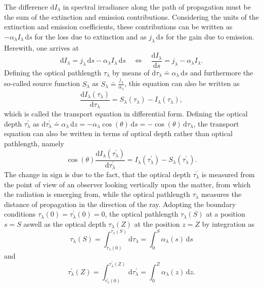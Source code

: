 \documentclass[a4paper,11pt]{report}
\def\fc#1{{\color{black}{#1}}} %
\begin{document}
The difference $\mathrm{d}I_\lambda$ in spectral irradiance along the path of propagation must be the sum of the extinction and emission contributions. Considering the units of the extinction and emission coefficients, these contributions can be written as $-\alpha_\lambda I_\lambda \,\mathrm{d}s$ for the loss due to extinction and as $j_\lambda \,\mathrm{d}s$ for the gain due to emission. Herewith, one arrives at \begin{equation}
\mathrm{d}I_\lambda = j_\lambda\,\mathrm{d}s - \alpha_\lambda I_\lambda\,\mathrm{d}s \quad \Leftrightarrow \quad \frac{\mathrm{d}I_\lambda}{\mathrm{d}s} = j_\lambda - \alpha_\lambda I_\lambda.
\end{equation} Defining the optical pathlength $\tau_\lambda$ by means of $\mathrm{d}\tau_\lambda \doteq \alpha_\lambda \,\mathrm{d}s$ and furthermore the so-called source function $S_\lambda$ as $S_\lambda \doteq \frac{j_\lambda}{\alpha_\lambda}$, this equation can also be written as \begin{equation}\label{eq:transportequationdiffform_opt_pathlength}
\frac{\mathrm{d}I_\lambda(\tau_\lambda)}{\mathrm{d}\tau_\lambda} = S_\lambda(\tau_\lambda) - I_\lambda(\tau_\lambda),
\end{equation} which is called the transport equation in differential form. Defining the optical depth $\tau^\prime_\lambda$ as $\mathrm{d}\tau^\prime_\lambda \doteq \alpha_\lambda\,\mathrm{d}z = -\alpha_\lambda \cos(\theta)\,\mathrm{d}s = -\cos(\theta)\,\mathrm{d}\tau_\lambda$, the transport equation can also be written in terms of optical depth rather than optical pathlength, namely \begin{equation}\label{eq:transportequationdiffform_opt_depth}
\cos(\theta)\frac{\mathrm{d}I_\lambda(\tau^\prime_\lambda)}{\mathrm{d}\tau^\prime_\lambda} = I_\lambda(\tau^\prime_\lambda) - S_\lambda(\tau^\prime_\lambda).
\end{equation} The change in sign is due to the fact, that the optical depth $\tau^\prime_\lambda$ is measured from the point of view of an observer looking vertically upon the matter, from which the radiation is emerging from, while the optical pathlength $\tau_\lambda$ measures the distance of propagation in the direction of the ray. Adopting the boundary conditions $\tau_\lambda(0) = \tau_\lambda^\prime(0) = 0$, the optical pathlength $\tau_\lambda(S)$ at a position $s=S$ aswell as the optical depth $\tau_\lambda(Z)$ at the position $z=Z$ \fc{are given} by integration as \begin{equation}
\tau_\lambda(S) = \int_{\tau_\lambda(0)}^{\tau_\lambda(S)} \mathrm{d}\tau_\lambda = \int_{0}^{S}\alpha_\lambda (s)\,\mathrm{d}s
\end{equation} and 
\begin{equation}
\tau_\lambda^\prime(Z) = \int_{\tau_\lambda^\prime(0)}^{\tau_\lambda^\prime(Z)}\,\mathrm{d}\tau_\lambda^\prime = \int_{0}^{Z} \alpha_\lambda(z)\,\mathrm{d}z.
\end{equation}
\end{document}
